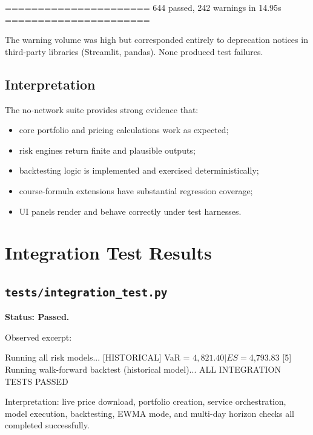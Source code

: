 \documentclass[11pt]{article}
\newcommand{\code}[1]{\texttt{#1}}
\begin{document}
\begin{shellcode}
====================== 644 passed, 242 warnings in 14.95s ======================
\end{shellcode}

The warning volume was high but corresponded entirely to
deprecation notices in third-party libraries (Streamlit, pandas).
None produced test failures.

\subsection{Interpretation}

The no-network suite provides strong evidence that:

\begin{itemize}
  \item core portfolio and pricing calculations work as expected;
  \item risk engines return finite and plausible outputs;
  \item backtesting logic is implemented and exercised deterministically;
  \item course-formula extensions have substantial regression coverage;
  \item UI panels render and behave correctly under test harnesses.
\end{itemize}

\section{Integration Test Results}

\subsection{\code{tests/integration\_test.py}}

\textbf{Status: Passed.}

Observed excerpt:
\begin{shellcode}
[4] Running all risk models...
    [HISTORICAL]  VaR = $4,821.40  |  ES = $4,793.83
[5] Running walk-forward backtest (historical model)...
ALL INTEGRATION TESTS PASSED
\end{shellcode}

Interpretation: live price download, portfolio creation, service
orchestration, model execution, backtesting, EWMA mode, and multi-day
horizon checks all completed successfully.
\end{document}
